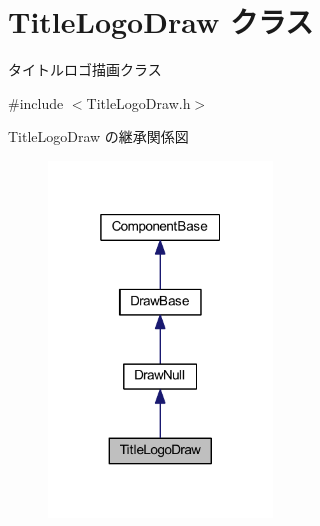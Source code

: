 \hypertarget{class_title_logo_draw}{}\section{Title\+Logo\+Draw クラス}
\label{class_title_logo_draw}


タイトルロゴ描画クラス  




{\ttfamily \#include $<$Title\+Logo\+Draw.\+h$>$}



Title\+Logo\+Draw の継承関係図\nopagebreak
\begin{figure}[H]
\begin{center}
\leavevmode
\includegraphics[width=169pt]{class_title_logo_draw__inherit__graph}
\end{center}
\end{figure}
